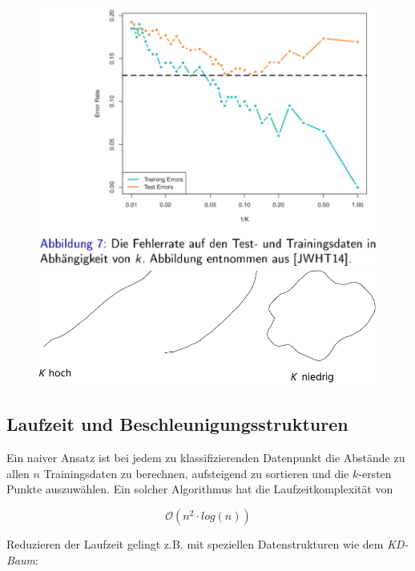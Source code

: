 \documentclass{report}
\begin{document}
\begin{figure}[H]
  \centering
  \begin{minipage}[b]{0.4\textwidth}
    \includegraphics[scale=.265]{ml05_6}
  \end{minipage}
  \hfill
  \begin{minipage}[b]{0.4\textwidth}
    \includegraphics[scale=.255]{ml05_8}
  \end{minipage}
\end{figure}

\subsection{Laufzeit und Beschleunigungsstrukturen}
Ein naiver Ansatz ist bei jedem zu klassifizierenden Datenpunkt die Abstände zu allen $n$ Trainingsdaten zu berechnen,
aufsteigend zu sortieren und die $k$-ersten Punkte auszuwählen. Ein solcher Algorithmus hat die Laufzeitkomplexität von

$$\mathcal{O}(n^2\cdot log(n))$$

Reduzieren der Laufzeit gelingt z.B. mit speziellen Datenstrukturen wie dem \textit{KD-Baum}:
\end{document}
